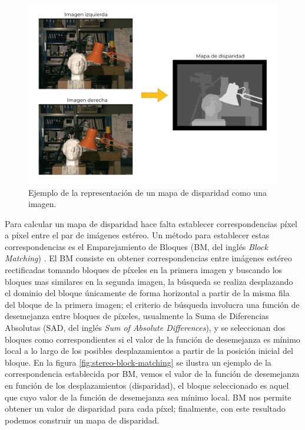 \begin{figure}[H]
    \centering
    \includegraphics[scale=0.4]{partes/ImgJoao/disparity-map.png}
    \caption[Ejemplo de la representación de un mapa de disparidad como una imagen.]{Ejemplo de la representación de un mapa de disparidad como una imagen\footnotemark.} 
    \label{fig:stereo-diparity-map}
\end{figure}

Para calcular un mapa de disparidad hace falta establecer correspondencias píxel a píxel entre el par de imágenes estéreo. Un método para establecer estas correspondencias es el Emparejamiento de Bloques (BM, del inglés \textit{Block Matching}) \cite{Baudes2009}. El BM consiste en obtener correspondencias entre imágenes estéreo rectificadas tomando bloques de píxeles en la primera imagen y buscando los bloques mas similares en la segunda imagen, la búsqueda se realiza desplazando el dominio del bloque únicamente de forma horizontal a partir de la misma fila del bloque de la primera imagen; el criterio de búsqueda involucra una función de desemejanza entre bloques de píxeles, usualmente la Suma de Diferencias Absolutas (SAD, del inglés \textit{Sum of Absolute Differences}), y se seleccionan dos bloques como correspondientes si el valor de la función de desemejanza es mínimo local a lo largo de los posibles desplazamientos a partir de la posición inicial del bloque. En la figura \ref{fig:stereo-block-matching} se ilustra un ejemplo de la correspondencia establecida por BM, vemos el valor de la función de desemejanza en función de los desplazamientos (disparidad), el bloque seleccionado es aquel que cuyo valor de la función de desemejanza sea mínimo local. BM nos permite obtener un valor de disparidad para cada píxel; finalmente, con este resultado podemos construir un mapa de disparidad.

